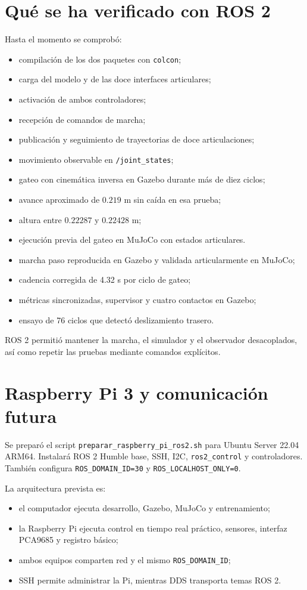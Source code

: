 \documentclass[11pt,a4paper]{article}
\begin{document}
\section{Qué se ha verificado con ROS 2}
Hasta el momento se comprobó:
\begin{itemize}
\item compilación de los dos paquetes con \texttt{colcon};
\item carga del modelo y de las doce interfaces articulares;
\item activación de ambos controladores;
\item recepción de comandos de marcha;
\item publicación y seguimiento de trayectorias de doce articulaciones;
\item movimiento observable en \texttt{/joint\_states};
\item gateo con cinemática inversa en Gazebo durante más de diez ciclos;
\item avance aproximado de $0.219$ m sin caída en esa prueba;
\item altura entre $0.22287$ y $0.22428$ m;
\item ejecución previa del gateo en MuJoCo con estados articulares.
\item marcha paso reproducida en Gazebo y validada articularmente en MuJoCo;
\item cadencia corregida de 4.32 s por ciclo de gateo;
\item métricas sincronizadas, supervisor y cuatro contactos en Gazebo;
\item ensayo de 76 ciclos que detectó deslizamiento trasero.
\end{itemize}

ROS 2 permitió mantener la marcha, el simulador y el observador desacoplados,
así como repetir las pruebas mediante comandos explícitos.

\section{Raspberry Pi 3 y comunicación futura}
Se preparó el script \texttt{preparar\_raspberry\_pi\_ros2.sh} para Ubuntu
Server 22.04 ARM64. Instalará ROS 2 Humble base, SSH, I2C,
\texttt{ros2\_control} y controladores. También configura
\texttt{ROS\_DOMAIN\_ID=30} y \texttt{ROS\_LOCALHOST\_ONLY=0}.

La arquitectura prevista es:
\begin{itemize}
\item el computador ejecuta desarrollo, Gazebo, MuJoCo y entrenamiento;
\item la Raspberry Pi ejecuta control en tiempo real práctico, sensores,
  interfaz PCA9685 y registro básico;
\item ambos equipos comparten red y el mismo \texttt{ROS\_DOMAIN\_ID};
\item SSH permite administrar la Pi, mientras DDS transporta temas ROS 2.
\end{itemize}
\end{document}
